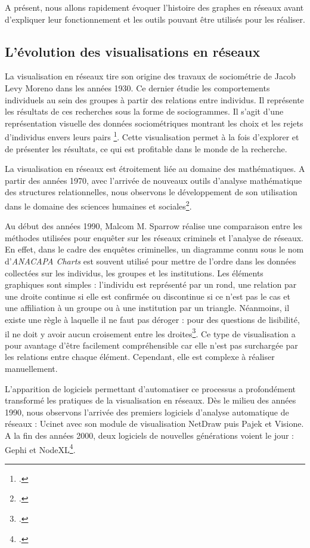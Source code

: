 A présent, nous allons rapidement évoquer l'histoire des graphes en réseaux avant d'expliquer leur fonctionnement et les outils pouvant être utilisés pour les réaliser.

\subsection{L'évolution des visualisations en réseaux}

La visualisation en réseaux tire son origine des travaux de sociométrie de Jacob Levy Moreno dans les années 1930. Ce dernier étudie les comportements individuels au sein des groupes à partir des relations entre individus. Il représente les résultats de ces recherches sous la forme de sociogrammes. Il s'agit d'une \og représentation visuelle des données sociométriques \fg montrant \og les choix et les rejets d'individus envers leurs pairs \fg\footcite{cristofoliPrincipesUsagesDessins2015}. Cette visualisation permet à la fois d'explorer et de présenter les résultats, ce qui est profitable dans le monde de la recherche. 

La visualisation en réseaux est étroitement liée au domaine des mathématiques. A partir des années 1970, avec l'arrivée de nouveaux outils d'analyse mathématique des structures relationnelles, nous observons le développement de son utilisation dans le domaine des sciences humaines et sociales\footcite{cristofoliPrincipesUsagesDessins2015}. 

Au début des années 1990, Malcom M. Sparrow réalise une comparaison entre les méthodes utilisées pour enquêter sur les réseaux criminels et l'analyse de réseaux. En effet, dans le cadre des enquêtes criminelles, un diagramme connu sous le nom d'\textit{ANACAPA Charts} est souvent utilisé pour mettre de l'ordre dans les données collectées sur les individus, les groupes et les institutions. Les éléments graphiques sont simples : l'individu est représenté par un rond, une relation par une droite continue si elle est confirmée ou discontinue si ce n'est pas le cas et une affiliation à un groupe ou à une institution par un triangle. Néanmoins, il existe une règle à laquelle il ne faut pas déroger : pour des questions de lisibilité, il ne doit y avoir aucun croisement entre les droites\footcite{cristofoliPrincipesUsagesDessins2015}. 
Ce type de visualisation a pour avantage d'être facilement compréhensible car elle n'est pas surchargée par les relations entre chaque élément. Cependant, elle est complexe à réaliser manuellement. 

L'apparition de logiciels permettant d'automatiser ce processus a profondément transformé les pratiques de la visualisation en réseaux. Dès le milieu des années 1990, nous observons l'arrivée des premiers logiciels d'analyse automatique de réseaux : Ucinet avec son module de visualisation NetDraw puis Pajek et Visione. A la fin des années 2000, deux logiciels de nouvelles générations voient le jour : Gephi et NodeXL\footcite{cristofoliPrincipesUsagesDessins2015}. 

